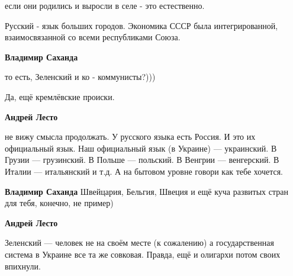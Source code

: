 \begin{itemize}
\begin{itemize}
если они родились и выросли в селе - это естественно.

Русский - язык больших городов. Экономика СССР была интегрированной,
взаимосвязанной со всеми республиками Союза.

 
\textbf{Владимир Саханда} 

то есть, Зеленский и ко - коммунисты?)))

Да, ещё кремлёвские происки.


 
\textbf{Андрей Лесто} 

не вижу смысла продолжать. У русского языка есть Россия. И это их официальный
язык. Наш официальный язык (в Украине) — украинский. В Грузии — грузинский. В
Польше — польский. В Венгрии — венгерский. В Италии — итальянский и т.д. А на
бытовом уровне говори как тебе хочется.

 
\textbf{Владимир Саханда} Швейцария, Бельгия, Швеция и ещё куча развитых стран для тебя, конечно, не пример)

 
\textbf{Андрей Лесто} 

Зеленский — человек не на своём месте (к сожалению) а государственная система в
Украине все та же совковая. Правда, ещё и олигархи потом своих впихнули.


 

\end{itemize}
\end{itemize}
